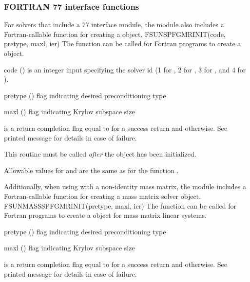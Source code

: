 \subsubsection*{FORTRAN 77 interface functions}
For solvers that include a {\F} 77 interface module, the
{\sunlinsolspfgmr} module also includes a Fortran-callable function
for creating a  object.
%
%
{
  FSUNSPFGMRINIT(code, pretype, maxl, ier)
}
{
  The function  can be called for Fortran programs
  to create a {\sunlinsolspfgmr} object.
}
{
  \begin{args}[pretype]
  \item[code] ()
    is an integer input specifying the solver id (1 for {\cvode}, 2
    for {\ida}, 3 for {\kinsol}, and 4 for {\arkode}).
  \item[pretype] ()
    flag indicating desired preconditioning type
  \item[maxl] ()
    flag indicating Krylov subspace size
  \end{args}
}
{
   is a return completion flag equal to  for a success
  return and  otherwise. See printed message for details in case
  of failure.
}
{
  This routine must be called \emph{after} the {\nvector} object has
  been initialized.

  Allowable values for  and  are the same as for
  the {\CC} function \newline {}. 
}
Additionally, when using {\arkode} with a non-identity
mass matrix, the {\sunlinsolspfgmr} module includes a Fortran-callable
function for creating a  mass matrix solver
object.
%
%
{
  FSUNMASSSPFGMRINIT(pretype, maxl, ier)
}
{
  The function  can be called for Fortran programs
  to create a {\sunlinsolspfgmr} object for mass matrix linear systems.
}
{
  \begin{args}[pretype]
  \item[pretype] ()
    flag indicating desired preconditioning type
  \item[maxl] ()
    flag indicating Krylov subspace size
  \end{args}
}
{
   is a  return completion flag equal to  for a success
  return and  otherwise. See printed message for details in case
  of failure.
}
